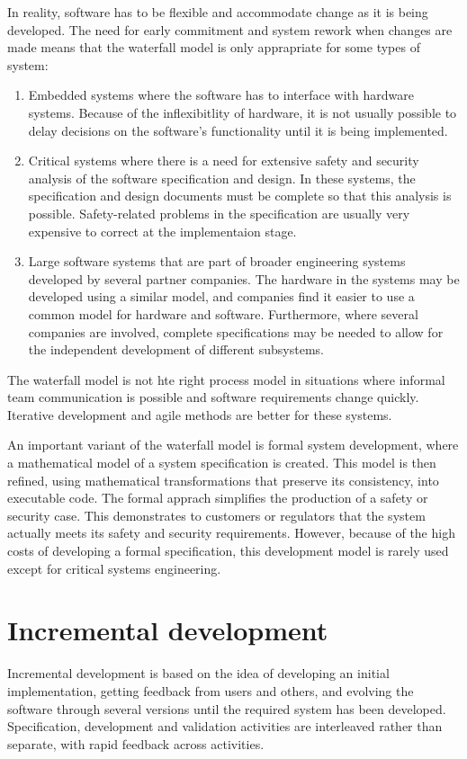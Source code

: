 In reality, software has to be flexible and accommodate change as it is being developed. The need for early commitment and system rework when changes are made means that the waterfall model is only apprapriate for some types of system:
\begin{enumerate}
    \item Embedded systems where the software has to interface with hardware systems. Because of the inflexibitlity of hardware, it is not usually possible to delay decisions on the software's functionality until it is being implemented.
    \item Critical systems where there is a need for extensive safety and security analysis of the software specification and design. In these systems, the specification and design documents must be complete so that this analysis is possible. Safety-related problems in the specification are usually very expensive to correct at the implementaion stage.
    \item Large software systems that are part of broader engineering systems developed by several partner companies. The hardware in the systems may be developed using a similar model, and companies find it easier to use a common model for hardware and software. Furthermore, where several companies are involved, complete specifications may be needed to allow for the independent development of different subsystems.
\end{enumerate}

The waterfall model is not hte right process model in situations where informal team communication is possible and software requirements change quickly. Iterative development and agile methods are better for these systems.

An important variant of the waterfall model is formal system development, where a mathematical model of a system specification is created. This model is then refined, using mathematical transformations that preserve its consistency, into executable code. The formal apprach simplifies the production of a safety or security case. This demonstrates to customers or regulators that the system actually meets its safety and security requirements. However, because of the high costs of developing a formal specification, this development model is rarely used except for critical systems engineering.

\section{Incremental development}
Incremental development is based on the idea of developing an initial implementation, getting feedback from  users and others, and evolving the software through several versions until the required system has been developed. Specification, development and validation activities are interleaved rather than separate, with rapid feedback across activities.

